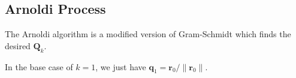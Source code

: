 \documentclass[12pt,a4paper]{article} %
\begin{document}
\subsection{Arnoldi Process}
The Arnoldi algorithm is a modified version of Gram-Schmidt which finds 
the desired $\mathbf Q_k$.

In the base case of $k=1$, 
we just have $\bm q_1 = \bm r_0 / \| \bm r_0 \|$.
\end{document}
